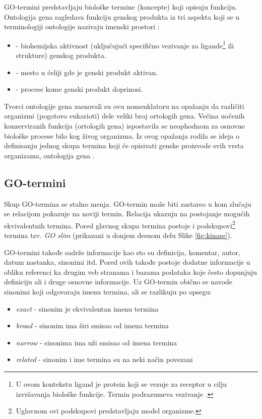 GO-termini predstavljaju biološke
termine (koncepte) koji opisuju funkciju. Ontologija gena sagledava funkciju
genskog produkta iz tri aspekta koji se u terminologiji ontologije nazivaju
imenski prostori :
\begin{itemize}
  \item {} - biohemijska aktivnost (uključujući
    specifično vezivanje za ligande\footnote{
      U ovom kontekstu ligand je protein koji se vezuje za receptor u cilju
      izvršavanja biološke funkcije. Termin podrazumeva vezivanje .
    } ili strukture) genskog produkta.
  \item {} - mesto u ćeliji gde je genski
    produkt aktivan.
  \item {} - procese kome genski produkt doprinosi.
\end{itemize}

Tvorci ontologije gena zasnovali su ovu nomenklatoru na opažanju da različiti
organizmi (pogotovo eukarioti) dele veliki broj ortologih gena. Većina uočenih
konzerviranih funkcija (ortologih gena) ispostavila se neophodnom za osnovne
biološke procese bilo kog živog organizma.  Iz ovog opažanja rodila se ideja o
definisanju jednog skupa termina koji će opisivati genske proizvode svih vrsta
organizama, ontologija gena \parencite{GO2000}.


\subsection{GO-termini}

Skup GO-termina se stalno menja. GO-termin može biti zastareo u kom slučaju se 
relacijom  pokazuje na noviji termin. Relacija
 ukazuju na postojanje mogućih ekvivalentnih termina. Pored
glavnog skupa termina postoje i podskupovi\footnote{Uglavnom ovi podskupovi
predstavljaju model organizme.} termina tzv. \textit{GO slim} (prikazani u donjem desnom
delu Slike \ref{fig:kinase}).

GO-termini takođe sadrže informacije kao sto su definicija, komentar, autor,
datum nastanka, sinonimi itd. Pored ovih takođe postoje dodatne informacije u
obliku referenci ka drugim veb stranama i bazama podataka koje često dopunjuju
definiciju ali i druge osnovne informacije.  Uz GO-termin obično se navode
sinonimi koji odgovaraju imenu termina, ali se razlikuju po opsegu:
\begin{itemize}
  \item \textit{exact} - sinonim je ekvivalentan imenu termina
  \item \textit{broad} - sinonim ima širi smisao od imena termina
  \item \textit{narrow} - sinonima ima uži smisao od imena termina
  \item \textit{related} - sinonim i ime termina su na neki način povezani
\end{itemize}

